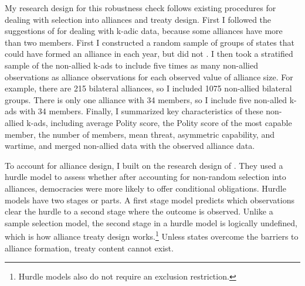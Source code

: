 \documentclass[12pt]{article}
\begin{document}
My research design for this robustness check follows existing procedures for dealing with selection into alliances and treaty design. 
First I followed the suggestions of \citet{Poast2010} for dealing with k-adic data, because some alliances have more than two members. 
First I constructed a random sample of groups of states that could have formed an alliance in each year, but did not \citep{FordhamPoast2014}.
I then took a stratified sample of the non-allied k-ads to include five times as many non-allied observations as alliance observations for each observed value of alliance size. 
For example, there are 215 bilateral alliances, so I included 1075 non-allied bilateral groups. 
There is only one alliance with 34 members, so I include five non-alled k-ads with 34 members. 
Finally, I summarized key characteristics of these non-allied k-ads, including average Polity score, the Polity score of the most capable member, the number of members, mean threat, asymmetric capability, and wartime, and merged non-allied data with the observed alliance data. 


To account for alliance design, I built on the research design of \citet{Chibaetal2015}. 
They used a hurdle model to assess whether after accounting for non-random selection into alliances, democracies were more likely to offer conditional obligations.
Hurdle models have two stages or parts.
A first stage model predicts which observations clear the hurdle to a second stage where the outcome is observed. 
Unlike a sample selection model, the second stage in a hurdle model is logically undefined, which is how alliance treaty design works.\footnote{Hurdle models also do not require an exclusion restriction.} 
Unless states overcome the barriers to alliance formation, treaty content cannot exist. 
\end{document}
